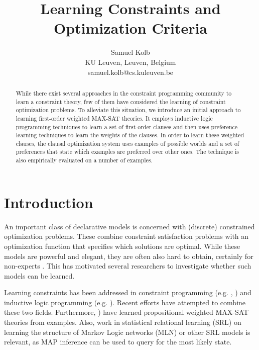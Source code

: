 \documentclass[letterpaper]{article}
\theoremstyle{definition}
\begin{document}
\title{Learning Constraints and Optimization Criteria}
\author{
  Samuel Kolb\\
  KU Leuven, Leuven, Belgium\\
  samuel.kolb@cs.kuleuven.be
}

\maketitle

\begin{abstract}
While there exist several approaches in the constraint programming community to learn a constraint theory, few of them have considered the learning of constraint optimization problems.
To alleviate this situation, we introduce an initial approach to learning first-order weighted MAX-SAT theories. 
It employs inductive logic programming techniques to learn a set of first-order clauses and then uses preference learning techniques to learn the weights of the clauses.
In order to learn these weighted clauses, the clausal optimization system uses examples of possible worlds and a set of preferences that state which examples are preferred over other ones.
The technique is also empirically evaluated on a number of examples.

\end{abstract}


\section{Introduction}
An important class of declarative models is concerned with (discrete) constrained optimization problems.
These combine constraint satisfaction problems with an optimization function that specifies which solutions are optimal.
While these models are powerful and elegant, they are often also hard to obtain, certainly for non-experts \cite{Wallace:PrinciplesCP}.
This has motivated several researchers to investigate whether such models can be learned. 

Learning constraints has been addressed in constraint programming (e.g. \cite{Beldiceanu:ModelSeeker}, \cite{bessiere2013constraint}) and inductive logic programming (e.g. \cite{DeRaedt:ClausalDiscovery}).
Recent efforts \cite{Lallouet:LearningCP} have attempted to combine these two fields.
Furthermore, \cite{campigotto2011active}) have learned propositional weighted MAX-SAT theories from examples.
Also, work in statistical relational learning (SRL) on learning the structure of Markov Logic networks (MLN) or other SRL models \cite{kok2005learning} is relevant, as MAP inference can be used to query for the most likely state. 
\end{document}
